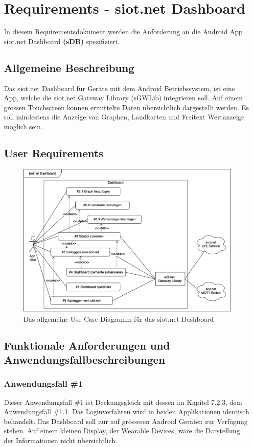 \newpage

\section{Requirements - siot.net Dashboard}
In diesem Requirementsdokument werden die Anforderung an die Android App siot.net Dashboard \textbf{(\gls{sDB})} spezifiziert.
\subsection{Allgemeine Beschreibung}
Das siot.net Dashboard für Geräte mit dem Android Betriebssystem, ist eine App, welche die siot.net Gateway Library (\gls{sGWLib}) integrieren soll. Auf einem grossen Touchscreen können ermittelte Daten übersichtlich dargestellt werden. Es soll mindestens die Anzeige von Graphen, Landkarten und Freitext Wertanzeige möglich sein.
\subsection{User Requirements}
\begin{figure}[h]
  \centering
  \includegraphics[scale=0.325]{98_Bilder/08_Requirements/UseCaseDashboard}
  \caption[Use Case siot.net Sensorcenter]{Das allgemeine Use Case Diagramm für das siot.net Dashboard}
\end{figure}
\newpage
\subsection{Funktionale Anforderungen und Anwendungsfallbeschreibungen}
\subsubsection{Anwendungsfall \#1}
Dieser Anwendungsfall \#1 ist Deckungsgleich mit dessen im Kapitel 7.2.3, dem Anwendungsfall \#1.1. Das Loginverfahren wird in beiden Applikationen identisch behandelt. Das Dashboard soll nur auf grösseren Android Geräten zur Verfügung stehen. Auf einem kleinen Display, der Wearable Devices, wäre die Darstellung der Informationen nicht übersichtlich.

